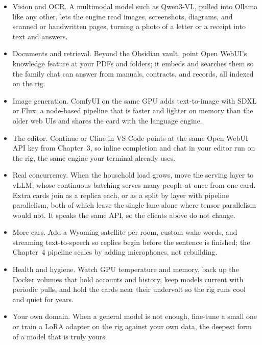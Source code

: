 \begin{itemize}
    \item Vision and OCR. A multimodal model such as Qwen3-VL, pulled into Ollama
    like any other, lets the engine read images, screenshots, diagrams, and scanned
    or handwritten pages, turning a photo of a letter or a receipt into text and
    answers\cite{ollamaVision}.

    \item Documents and retrieval. Beyond the Obsidian vault, point Open WebUI's
    knowledge feature at your PDFs and folders; it embeds and searches them so the
    family chat can answer from manuals, contracts, and records, all indexed on the
    rig\cite{openwebuiRAG}.

    \item Image generation. ComfyUI on the same GPU adds text-to-image with SDXL or
    Flux, a node-based pipeline that is faster and lighter on memory than the
    older web UIs and shares the card with the language engine\cite{comfyuiRepo}.

    \item The editor. Continue or Cline in VS Code points at the same Open WebUI API
    key from Chapter~3, so inline completion and chat in your editor run on the rig,
    the same engine your terminal already uses.

    \item Real concurrency. When the household load grows, move the serving layer to
    vLLM, whose continuous batching serves many people at once from one
    card. Extra cards join as a replica each, or as a split by layer with pipeline
    parallelism, both of which leave the single lane alone where tensor
    parallelism would not. It speaks the same API, so the clients above do not
    change\cite{vllmParallelism}.

    \item More ears. Add a Wyoming satellite per room, custom wake words, and
    streaming text-to-speech so replies begin before the sentence is finished; the
    Chapter~4 pipeline scales by adding microphones, not rebuilding.

    \item Health and hygiene. Watch GPU temperature and memory, back up the Docker
    volumes that hold accounts and history, keep models current with periodic pulls,
    and hold the cards near their undervolt so the rig runs cool and quiet for years.

    \item Your own domain. When a general model is not enough, fine-tune a small one
    or train a LoRA adapter on the rig against your own data, the deepest form of a
    model that is truly yours.
\end{itemize}


